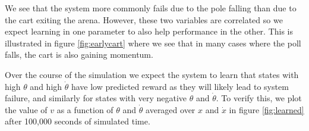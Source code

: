 \documentclass{article}
\begin{document}
We see that the system more commonly fails due to the pole falling than due to the cart exiting the arena. However, these two variables are correlated so we expect learning in one parameter to also help performance in the other.
This is illustrated in figure \ref{fig:earlycart} where we see that in many cases where the poll falls, the cart is also gaining momentum.

Over the course of the simulation we expect the system to learn that states with high $\theta$ and high $\dot \theta$ have low predicted reward as they will likely lead to system failure, and similarly for states with very negative $\theta$ and $\dot \theta$. To verify this, we plot the value of $v$ as a function of $\theta$ and $\dot \theta$ averaged over $x$ and $\dot x$ in figure \ref{fig:learned} after 100,000 seconds of simulated time.
\end{document}
